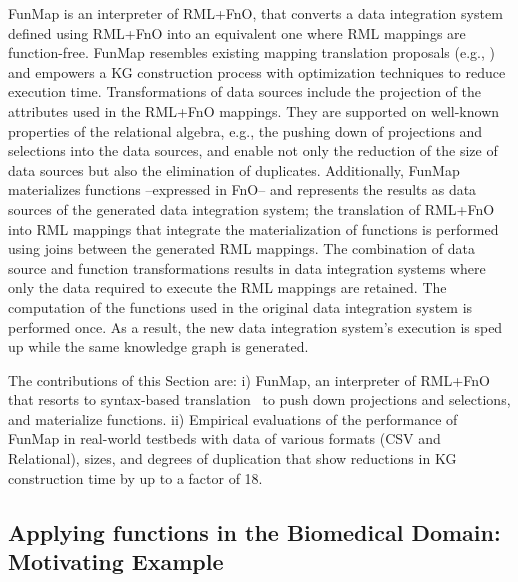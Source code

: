 FunMap is an interpreter of RML+FnO, that converts a data integration system defined using RML+FnO into an equivalent one where RML mappings are function-free. FunMap resembles existing mapping translation proposals (e.g., \citep{AliW19,corcho2019towards,junior2016funul}) and empowers a KG construction process with optimization techniques to reduce execution time. Transformations of data sources include the projection of the attributes used in the RML+FnO mappings. They are supported on well-known properties of the relational algebra, e.g., the pushing down of projections and selections into the data sources, and enable not only the reduction of the size of data sources but also the elimination of duplicates. Additionally, FunMap materializes functions --expressed in FnO-- and represents the results as data sources of the generated data integration system; the translation of RML+FnO into RML mappings that integrate the materialization of functions is performed using joins between the generated RML mappings. The combination of data source and function transformations results in data integration systems where only the data required to execute the RML mappings are retained. The computation of the functions used in the original data integration system is performed once. As a result, the new data integration system's execution is sped up while the same knowledge graph is generated. 

The contributions of this Section are: i) FunMap, an interpreter of RML+FnO that resorts to syntax-based translation~\citep{aho1986compilers} to push down projections and selections, and materialize functions. ii) Empirical evaluations of the performance of FunMap in real-world testbeds with data of various formats (CSV and Relational), sizes, and degrees of duplication that show reductions in KG construction time by up to a factor of 18.

\subsection{Applying functions in the Biomedical Domain: Motivating Example}

